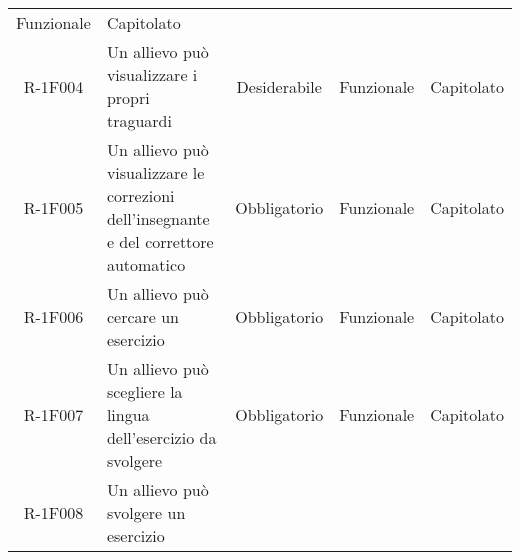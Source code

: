 \begin{tabularx}{\textwidth}{cXccc}
Funzionale &

Capitolato \\
R-1F004 &



Un allievo può visualizzare i propri traguardi &

Desiderabile &

Funzionale &

Capitolato \\
R-1F005 &



Un allievo può visualizzare le correzioni dell’insegnante e del correttore automatico &

Obbligatorio &

Funzionale &

Capitolato \\
R-1F006 &




Un allievo può cercare un esercizio &

Obbligatorio &

Funzionale &

Capitolato \\
R-1F007 &

Un allievo può scegliere la lingua dell’esercizio da svolgere &

Obbligatorio &

Funzionale &

Capitolato \\
R-1F008 &


Un allievo può svolgere un esercizio &


\end{tabularx}
